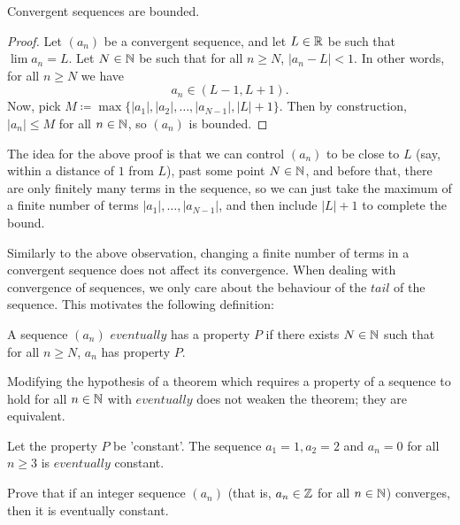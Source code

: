 \documentclass[../analysis1.tex]{subfiles}
\begin{document}
\begin{theorem}
\label{thm:boundedseq}
    \begin{shaded*}
        Convergent sequences are bounded.
    \end{shaded*}
\end{theorem}
\begin{proof}
    Let $(a_n)$ be a convergent sequence, and let $L\in\mathbb{R}$ be such that $\lim a_n = L$. Let $N\in\mathbb{N}$ be such that for all $n\ge N$, $|a_n-L|<1.$ In other words, for all $n\ge N$ we have $$a_n\in (L-1,L+1).$$
    Now, pick $M\coloneqq \max\{|a_1|,|a_2|,\dots,|a_{N-1}|,|L|+1\}$. Then by construction, $|a_n|\le M$ for all $n\in \mathbb{N}$, so $(a_n)$ is bounded.\qedhere
\end{proof}
\begin{remark}
    The idea for the above proof is that we can control $(a_n)$ to be close to $L$ (say, within a distance of $1$ from $L$), past some point $N\in\mathbb{N}$, and before that, there are only finitely many terms in the sequence, so we can just take the maximum of a finite number of terms $|a_1|,\dots,|a_{N-1}|$, and then include $|L|+1$ to complete the bound.
\end{remark}
Similarly to the above observation, changing a finite number of terms in a convergent sequence does not affect its convergence. When dealing with convergence of sequences, we only care about the behaviour of the $tail$ of the sequence.
This motivates the following definition:
\begin{definition}
    \begin{shaded*}
        A sequence $(a_n)$ $eventually$ has a property $P$ if there exists $N\in\mathbb{N}$ such that for all $n\ge N$, $a_n$ has property $P$.
    \end{shaded*}
\end{definition}

\begin{remark}
    Modifying the hypothesis of a theorem which requires a property of a sequence to hold for all $n\in \mathbb{N}$ with $eventually$ does not weaken the theorem; they are equivalent. 
\end{remark}

\begin{example}
    Let the property $P$ be 'constant'. The sequence $a_1=1,a_2=2$ and $a_n=0$ for all $n\ge 3$ is $eventually$ constant.
\end{example}
\begin{exercise*}
    Prove that if an integer sequence $(a_n)$ (that is, $a_n\in\mathbb{Z}$ for all $n\in\mathbb{N}$) converges, then it is eventually constant.
\end{exercise*}
\end{document}
